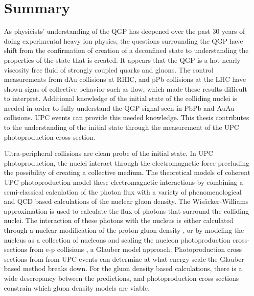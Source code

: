 \chapter{Summary}
  As physicists' understanding of the QGP has deepened over the past 30 years
    of doing experimental heavy ion physics, the questions surrounding the
    QGP have shift from the confirmation of creation of a deconfined state
    to understanding the properties of the state that is created.
  It appears that the QGP is a hot nearly viscosity free fluid of strongly 
    coupled quarks and gluons. 
  The control measurements from dAu collisions at RHIC, and pPb collisions
    at the LHC have shown signs of collective behavior such as flow, which 
    made these results difficult to interpret.
  Additional knowledge of the initial state of the colliding nuclei is needed
    in order to fully understand the QGP signal seen in PbPb and AuAu 
    collisions.
  UPC events can provide this needed knowledge. 
  This thesis contributes to the understanding of the initial state through
    the measurement of the UPC \JPsi{} photoproduction cross section. 

  Ultra-peripheral collisions are clean probe of the initial state. 
  In UPC \JPsi{} photoproduction, the nuclei interact through the 
    electromagnetic force precluding the possibility of creating a collective
    medium.
  The theoretical models of coherent UPC \JPsi{} photoproduction model these 
    electromagnetic interactions by combining a semi-classical calculation 
    of the photon flux with a variety of phenomenological and QCD based 
    calculations of the nuclear gluon density. 
  The Wis\"{a}cker-Williams approximation \cite{WWFermi} is used to calculate 
    the flux of photons that surround the colliding nuclei. 
  The interaction of these photons with the nucleus is either calculated 
    through a nuclear modification of the proton gluon density 
    \cite{pQCD2013.02, lta2012.03}, or by modeling the nucleus as a collection
    of nucleons and scaling the nucleon photoproduction cross-sections from 
    e-p collisions \cite{vmd1999}, a Glauber model approach. 
  Photoproduction cross sections from from UPC events can determine at what 
    energy scale the Glauber based method breaks down.
  For the gluon density based calculations, there is a wide descrepancy 
    between the predictions, and photoproduction cross sections constrain which
    gluon density models are viable. 

